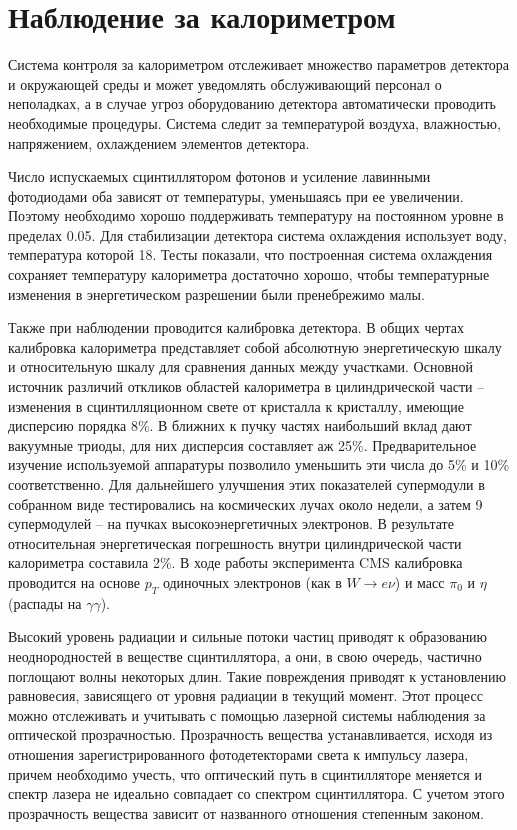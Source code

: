 \documentclass[a4paper, 10pt, twocolumn]{article}
\begin{document}
\section{Наблюдение за калориметром}
Система контроля за калориметром отслеживает множество параметров детектора и окружающей среды и может уведомлять обслуживающий персонал о неполадках, а в случае угроз оборудованию детектора автоматически проводить необходимые процедуры. Система следит за температурой воздуха, влажностью, напряжением, охлаждением элементов детектора. 

Число испускаемых сцинтиллятором фотонов и усиление лавинными фотодиодами оба зависят от температуры, уменьшаясь при ее увеличении. 
Поэтому необходимо хорошо поддерживать температуру на постоянном уровне в пределах 0.05. 
Для стабилизации детектора система охлаждения использует воду, температура которой 18. 
Тесты показали, что построенная система охлаждения сохраняет температуру калориметра достаточно хорошо, чтобы температурные изменения в энергетическом разрешении были пренебрежимо малы. 

Также при наблюдении проводится калибровка детектора. 
В общих чертах калибровка калориметра представляет собой абсолютную энергетическую шкалу и относительную шкалу для сравнения данных между участками. 
Основной источник различий откликов областей калориметра в цилиндрической части -- изменения в сцинтилляционном свете от кристалла к кристаллу, имеющие дисперсию порядка 8\%. 
В ближних к пучку частях наибольший вклад дают вакуумные триоды, для них дисперсия составляет аж 25\%. 
Предварительное изучение используемой аппаратуры позволило уменьшить эти числа до 5\% и 10\% соответственно. 
Для дальнейшего улучшения этих показателей супермодули в собранном виде тестировались на космических лучах около недели, а затем 9 супермодулей -- на пучках высокоэнергетичных электронов. 
В результате относительная энергетическая погрешность внутри цилиндрической части калориметра составила 2\%. 
В ходе работы эксперимента CMS калибровка проводится на основе $p_T$ одиночных электронов (как в $W\to e\nu$) и масс $\pi_0$ и $\eta$ (распады на $\gamma\gamma$). 

Высокий уровень радиации и сильные потоки частиц приводят к образованию неоднородностей в веществе сцинтиллятора, а они, в свою очередь, частично поглощают волны некоторых длин. 
Такие повреждения приводят к установлению равновесия, зависящего от уровня радиации в текущий момент. 
Этот процесс можно отслеживать и учитывать с помощью лазерной системы наблюдения за оптической прозрачностью. 
Прозрачность вещества устанавливается, исходя из отношения зарегистрированного фотодетекторами света к импульсу лазера, причем необходимо учесть, что оптический путь в сцинтилляторе меняется и спектр лазера не идеально совпадает со спектром сцинтиллятора. 
С учетом этого прозрачность вещества зависит от названного отношения степенным законом. 
\end{document}
